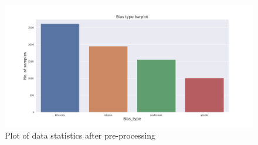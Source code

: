 \begin{table}[]
\centering
{}
\caption{Data statistics after pre-processing }
\label{tab:Bias_type_stats_preprocessing}
\end{table}

\begin{figure}[]
    \centering
    \includegraphics[width=1\columnwidth]{thesis/figures/Bias_type_barplot.png}
    \caption{Plot of data statistics after pre-processing}
    \label{fig:bias_type_barplot}
\end{figure}

